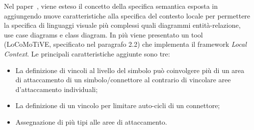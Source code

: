         

        \noindent
        Nel paper~\cite{extending_localcontext}, viene esteso il concetto della specifica semantica esposta in~\cite{localcontext_recognition} aggiungendo nuove caratteristiche alla specifica del contesto locale per permettere la specifica di linguaggi visuale più complessi quali diagrammi entità-relazione, use case diagrams e class diagram. In più viene presentato un tool (LoCoMoTiVE, specificato nel paragrafo 2.2) che implementa il framework \textit{Local Context}.
        \newline
        Le principali caratteristiche aggiunte sono tre:
        \begin{itemize}
            \item La definizione di vincoli al livello del simbolo può coinvolgere più di un area di attaccamento di un simbolo/connettore al contrario di vincolare aree d'attaccamento individuali;
            \item La definizione di un vincolo per limitare auto-cicli di un connettore;
            \item Assegnazione di più tipi alle aree di attaccamento.
        \end{itemize}

